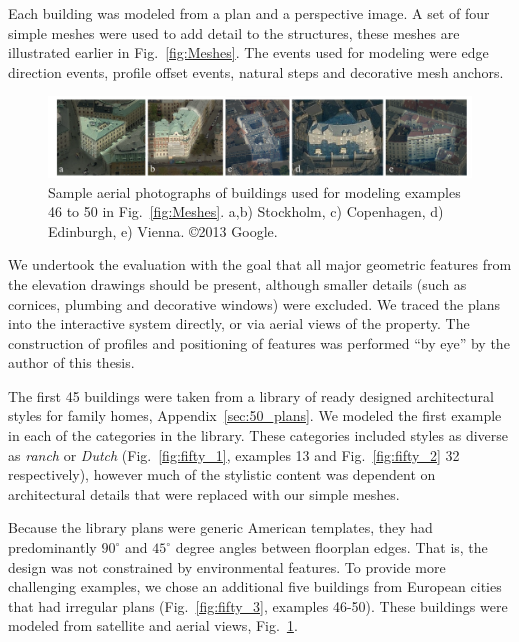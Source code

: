 Each building was modeled from a plan and a perspective image. A set of four simple meshes were used to add detail to the structures, these meshes are illustrated earlier in Fig.~\ref{fig:Meshes}. The events used for modeling were edge direction events, profile offset events, natural steps and decorative mesh anchors.

\begin{figure}
  \centering
  \includegraphics[width=1.0\columnwidth]{european_blocks.png}
  \caption[Further source material for interactive evaluation]{\label{fig:european}Sample aerial photographs of buildings used for modeling examples 46 to 50 in Fig.~\ref{fig:Meshes}. a,b) Stockholm, c) Copenhagen, d) Edinburgh, e) Vienna. \copyright 2013 Google.}
\end{figure}

We undertook the evaluation with the goal that all major geometric features from the elevation drawings should be present, although smaller details (such as cornices, plumbing and decorative windows) were excluded. We traced the plans into the interactive system directly, or via aerial views of the property. The construction of profiles and positioning of features was performed ``by eye'' by the author of this thesis.

The first 45 buildings were taken from a library of ready designed architectural styles for family homes\cite{ePlans}, Appendix~\ref{sec:50_plans}. We modeled the first example in each of the categories in the library. These categories included styles as diverse as \emph{ranch} or \emph{Dutch} (Fig.~\ref{fig:fifty_1}, examples 13 and Fig.~\ref{fig:fifty_2} 32 respectively), however much of the stylistic content was dependent on architectural details that were replaced with our simple meshes. 

Because the library plans were generic American templates, they had predominantly $90^\circ$ and $45^\circ$ degree angles between floorplan edges. That is, the design was not constrained by environmental features. To provide more challenging examples, we chose an additional five buildings from European cities that had irregular plans (Fig.~\ref{fig:fifty_3}, examples 46-50). These buildings were modeled from satellite and aerial views, Fig.~\ref{fig:european}.

